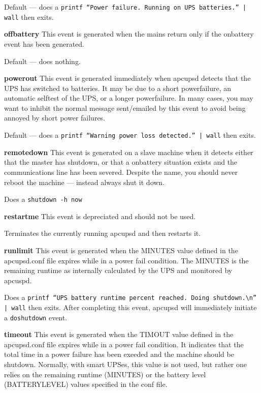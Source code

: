 {{{{{{{{{\begin{description}
Default {---} does a {\tt printf ``Power failure. Running on UPS batteries.''
| wall} then exits.  

\item {\bf offbattery}
This event is generated when the mains return only if the onbattery event has
been generated.  

Default {---} does nothing.  

\item {\bf powerout}
This event is generated immediately when apcupsd detects that the UPS has
switched to batteries. It may be due to a short powerfailure, an automatic
selftest of the UPS, or a longer powerfailure. In many cases, you may want to
inhibit the normal message sent/emailed by this event to avoid being annoyed
by short power failures.  

Default {---} does a {\tt printf ``Warning power loss detected.'' | wall} then
exits.  

\item {\bf remotedown}
This event is generated on a slave machine when it detects either that the
master has shutdown, or that a onbattery situation exists and the
communications line has been severed. Despite the name, you should never
reboot the machine {---} instead always shut it down.  

Does a {\tt shutdown -h now}  

\item {\bf restartme}
This event is depreciated and should not be used.  

Terminates the currently running apcupsd and then restarts it.  

\item {\bf runlimit}
This event is generated when the MINUTES value defined in the apcupsd.conf
file expires while in a power fail condition. The MINUTES is the remaining
runtime as internally calculated by the UPS and monitored by apcuspd.  

Does a {\tt printf ``UPS battery runtime percent reached. Doing
shutdown.\textbackslash{}n'' | wall} then exits.  After completing this event,
apcupsd will immediately initiate a {\tt doshutdown} event.  

\item {\bf timeout}
This event is generated when the TIMOUT value defined in the apcupsd.conf file
expires while in a power fail condition. It indicates that the total time in a
power failure has been exeeded and the machine should be shutdown. Normally,
with smart UPSes, this value is not used, but rather one relies on the
remaining runtime (MINUTES) or the battery level (BATTERYLEVEL) values
specified in the conf file.  


\end{description}}}}}}}}}}
